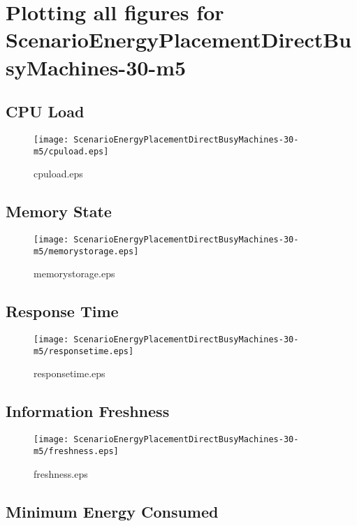 \documentclass{elsart}
\begin{document}
\section{Plotting all figures for ScenarioEnergyPlacementDirectBusyMachines-30-m5}
\subsection{CPU Load}

\begin{figure}[ht]
\centering
\texttt{[image: ScenarioEnergyPlacementDirectBusyMachines-30-m5/cpuload.eps]}
\caption{cpuload.eps}\label{fig:cpuload}
\end{figure}

\clearpage
\subsection{Memory State}

\begin{figure}[ht]
\centering
\texttt{[image: ScenarioEnergyPlacementDirectBusyMachines-30-m5/memorystorage.eps]}
\caption{memorystorage.eps}\label{fig:memorystorage}
\end{figure}

\clearpage
\subsection{Response Time}

\begin{figure}[ht]
\centering
\texttt{[image: ScenarioEnergyPlacementDirectBusyMachines-30-m5/responsetime.eps]}
\caption{responsetime.eps}\label{fig:responsetime}
\end{figure}

\clearpage
\subsection{Information Freshness}

\begin{figure}[ht]
\centering
\texttt{[image: ScenarioEnergyPlacementDirectBusyMachines-30-m5/freshness.eps]}
\caption{freshness.eps}\label{fig:freshness}
\end{figure}

\clearpage
\subsection{Minimum Energy Consumed}
\end{document}

